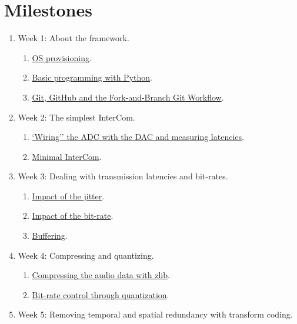 \section{Milestones}
\begin{enumerate}
\item Week 1: About the framework.
\begin{enumerate}
\item \href{https://tecnologias-multimedia.github.io/study_guide/01-provisioning/}{OS provisioning}.
\item \href{https://tecnologias-multimedia.github.io/study_guide/02-python/}{Basic programming with Python}.
\item \href{https://tecnologias-multimedia.github.io/study_guide/03-git/}{Git, GitHub and the Fork-and-Branch Git Workflow}.
\end{enumerate}
\item Week 2: The simplest InterCom.
\begin{enumerate}
\item \href{https://tecnologias-multimedia.github.io/study_guide/04-wiring/}{`Wiring'' the ADC with the DAC and measuring latencies}.
\item \href{https://tecnologias-multimedia.github.io/study_guide/05-minimal/}{Minimal InterCom}.
\end{enumerate}
\item Week 3: Dealing with transmission latencies and bit-rates.
\begin{enumerate}
\item \href{https://tecnologias-multimedia.github.io/study_guide/06-jitter_impact/}{Impact of the jitter}.
\item \href{https://tecnologias-multimedia.github.io/study_guide/07-bit-rate_impact/}{Impact of the bit-rate}.
\item \href{https://tecnologias-multimedia.github.io/study_guide/08-buffer/}{Buffering}.
\end{enumerate}
\item Week 4: Compressing and quantizing.
\begin{enumerate}
\item \href{https://tecnologias-multimedia.github.io/study_guide/09-compress/}{Compressing the audio data with zlib}.
\item \href{https://tecnologias-multimedia.github.io/study_guide/10-br_control/}{Bit-rate control through quantization}.
\end{enumerate}
\item Week 5: Removing temporal and spatial redundancy with transform coding.

\end{enumerate}
